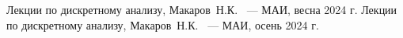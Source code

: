 \begin{thebibliography}{99}
 Лекции по дискретному анализу, Макаров\, Н.К. ~--- МАИ, весна 2024 г.
 Лекции по дискретному анализу, Макаров\, Н.К. ~--- МАИ, осень 2024 г.
\end{thebibliography}
\pagebreak


